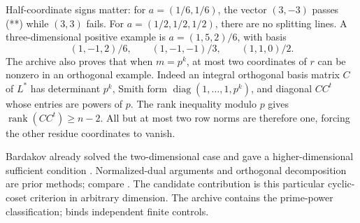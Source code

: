 Half-coordinate signs matter: for \(a=(1/6,1/6)\), the vector
\((3,-3)\) passes (**) while \((3,3)\) fails. For
\(a=(1/2,1/2,1/2)\), there are no splitting lines.
A three-dimensional positive example is \(a=(1,5,2)/6\), with basis
\[
 (1,-1,2)/6,\qquad (1,-1,-1)/3,\qquad (1,1,0)/2.
\]
The archive also proves that when \(m=p^k\), at most two coordinates
of \(r\) can be nonzero in an orthogonal example. Indeed an integral
orthogonal basis matrix \(C\) of \(L^*\) has determinant \(p^k\),
Smith form \(\operatorname{diag}(1,\ldots,1,p^k)\), and diagonal
\(CC^t\) whose entries are powers of \(p\).
The rank inequality modulo \(p\) gives
\(\operatorname{rank}(CC^t)\ge n-2\).
All but at most two row norms are therefore one, forcing the other
residue coordinates to vanish.

Bardakov already solved the two-dimensional case and gave a
higher-dimensional sufficient condition \cite{bardakov-lattices}.
Normalized-dual arguments and orthogonal decomposition are prior
methods; compare \cite{cgg-orthogonality,hemkemeier-vallentin}.
The candidate contribution is this particular cyclic-coset criterion
in arbitrary dimension. The archive
 contains the prime-power classification;
 binds independent finite controls.
